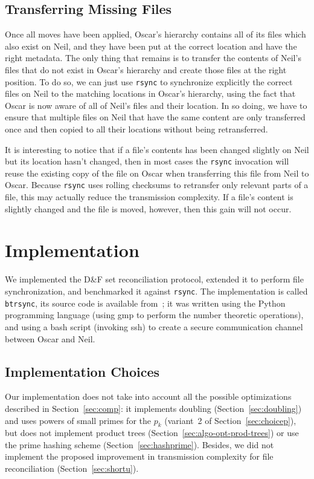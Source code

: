 \documentclass[twoside,envcountsame,runningheads]{llncs}
\newcommand{\df}{D\&F\xspace}
\newcommand{\btrsync}{\texttt{btrsync}\xspace}
\newcommand{\rsync}{\texttt{rsync}\xspace}
\begin{document}
\subsection{Transferring Missing Files}
\label{sec:transferring}

Once all moves have been applied, Oscar's hierarchy contains all of its files
which also exist on Neil, and they have been put at the correct location and have the right metadata. The
only thing that remains is to transfer the contents of Neil's files that do not
exist in Oscar's hierarchy and create those files at the right position. To do
so, we can just use \rsync to synchronize explicitly the correct
files on Neil to the matching locations in Oscar's hierarchy, using the fact that
Oscar is now aware of all of Neil's files and their location. In so doing, we have to ensure that multiple files on Neil that have the same content are only transferred once and then copied to all their locations without being retransferred.

It is interesting to notice that if a file's contents has been changed slightly on Neil but its location hasn't changed, then in most cases the \rsync invocation will reuse the existing copy of the file on Oscar when transferring this file from Neil to Oscar. Because \rsync uses rolling checksums to retransfer only relevant parts of a file, this may actually reduce the transmission complexity. If a file's content is slightly changed and the file is moved, however, then this gain will not occur.

\section{Implementation}
\label{sec:program}

We implemented the \df set reconciliation protocol, extended it to perform file
synchronization, and benchmarked it against \rsync. The implementation is called
\btrsync, its source code is available from~\cite{Robin}; it was written using
the Python programming language (using {\sf gmp} to perform the number theoretic
operations), and using a bash script (invoking ssh) to create a secure communication
channel between Oscar and Neil.

\subsection{Implementation Choices}

Our implementation does not take into account all the possible optimizations
described in Section~\ref{sec:comp}: it implements doubling
(Section~\ref{sec:doubling}) and uses powers of small primes for the $p_k$
(variant~2 of Section~\ref{sec:choicep}), but does not implement product trees
(Section~\ref{sec:algo-opt-prod-trees}) or use the prime hashing scheme
(Section~\ref{sec:hashprime}).
Besides, we did not implement the proposed improvement in transmission complexity for file reconciliation (Section~\ref{sec:shortu}).
\end{document}
